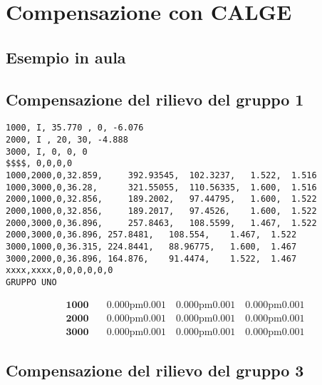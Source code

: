\chapter{Compensazione con CALGE}
\section{Esempio in aula}
\section{Compensazione del rilievo del gruppo 1}
\begin{footnotesize}\centering
\begin{lstlisting}
1000, I, 35.770 , 0, -6.076
2000, I , 20, 30, -4.888
3000, I, 0, 0, 0
$$$$, 0,0,0,0
1000,2000,0,32.859,     392.93545,	102.3237,	1.522,	1.516
1000,3000,0,36.28,      321.55055,	110.56335,	1.600,	1.516
2000,1000,0,32.856,     189.2002,	97.44795,	1.600,	1.522
2000,1000,0,32.856,     189.2017,	97.4526,	1.600,	1.522
2000,3000,0,36.896,     257.8463,	108.5599,	1.467,	1.522
2000,3000,0,36.896,	257.8481,	108.554,	1.467,	1.522
3000,1000,0,36.315,	224.8441,	88.96775,	1.600,	1.467
3000,2000,0,36.896,	164.876,	91.4474,	1.522,	1.467
xxxx,xxxx,0,0,0,0,0,0
GRUPPO UNO
\end{lstlisting}
\end{footnotesize}
\begin{align*}
	\mathbf{1000}&\quad \si{0.000 \pm 0.001}{} \quad \si{0.000 \pm 0.001}{} \quad \si{0.000 \pm 0.001}{}\\
	\mathbf{2000}&\quad \si{0.000 \pm 0.001}{} \quad \si{0.000 \pm 0.001}{} \quad \si{0.000 \pm 0.001}{}\\
	\mathbf{3000}&\quad \si{0.000 \pm 0.001}{} \quad \si{0.000 \pm 0.001}{} \quad \si{0.000 \pm 0.001}{}
\end{align*}


\section{Compensazione del rilievo del gruppo 3}